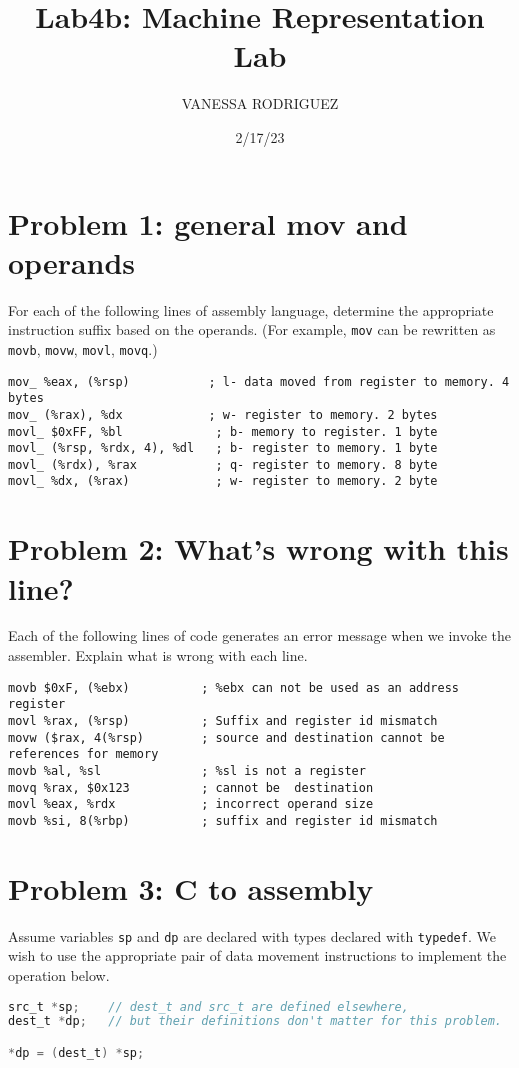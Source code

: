\documentclass{article}
\title{Lab4b: Machine Representation Lab}
\author{VANESSA RODRIGUEZ}
\date{2/17/23}
\begin{document}
\maketitle

\section{Problem 1: general mov and operands}
For each of the following lines of assembly language, determine the appropriate instruction suffix based on the operands. (For example, \texttt{mov} can be rewritten as \texttt{movb}, \texttt{movw}, \texttt{movl}, \texttt{movq}.)

\begin{lstlisting}[language={[x86masm]assembler}]
mov_ %eax, (%rsp)           ; l- data moved from register to memory. 4 bytes
mov_ (%rax), %dx            ; w- register to memory. 2 bytes
movl_ $0xFF, %bl             ; b- memory to register. 1 byte
movl_ (%rsp, %rdx, 4), %dl   ; b- register to memory. 1 byte
movl_ (%rdx), %rax           ; q- register to memory. 8 byte
movl_ %dx, (%rax)            ; w- register to memory. 2 byte
\end{lstlisting}

\section{Problem 2: What's wrong with this line?}
Each of the following lines of code generates an error message when we invoke the assembler. Explain what is wrong with each line.
\begin{lstlisting}
movb $0xF, (%ebx)          ; %ebx can not be used as an address register
movl %rax, (%rsp)          ; Suffix and register id mismatch
movw ($rax, 4(%rsp)        ; source and destination cannot be references for memory 
movb %al, %sl              ; %sl is not a register
movq %rax, $0x123          ; cannot be  destination
movl %eax, %rdx            ; incorrect operand size
movb %si, 8(%rbp)          ; suffix and register id mismatch
\end{lstlisting}

\newpage
\section{Problem 3: C to assembly}
Assume variables \texttt{sp} and \texttt{dp} are declared with types declared with \texttt{typedef}. We wish to use the appropriate pair of data movement instructions to implement the operation below.
\begin{lstlisting}[language={C}]
src_t *sp;    // dest_t and src_t are defined elsewhere,
dest_t *dp;   // but their definitions don't matter for this problem.

*dp = (dest_t) *sp;
\end{lstlisting}
\end{document}
